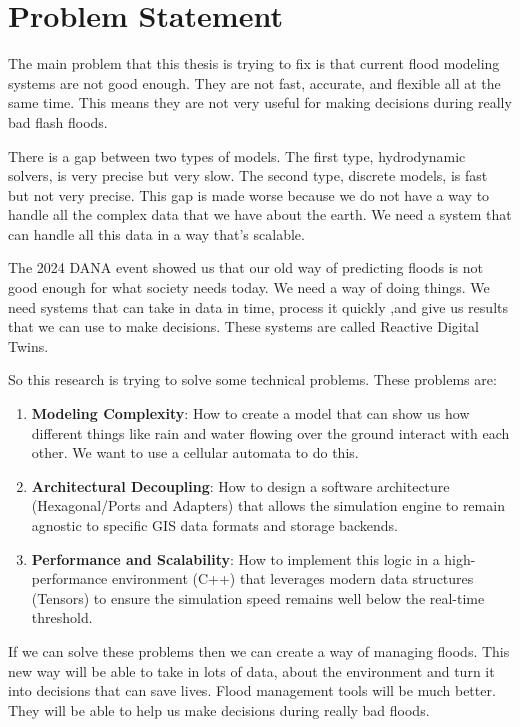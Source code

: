 \section{Problem Statement}

The main problem that this thesis is trying to fix is that current flood modeling systems are not good enough. They are not fast, 
accurate, and flexible all at the same time. This means they are not very useful for making decisions during really bad flash floods.

There is a gap between two types of models. The first type, hydrodynamic solvers, is very precise but very slow. The second type, 
discrete models, is fast but not very precise. This gap is made worse because we do not have a way to handle all the complex data 
that we have about the earth. We need a system that can handle all this data in a way that's scalable.

The 2024 DANA event showed us that our old way of predicting floods is not good enough for what society needs today. We need a way 
of doing things. We need systems that can take in data in time, process it quickly ,and give us results that we can use to make 
decisions. These systems are called Reactive Digital Twins.

So this research is trying to solve some technical problems. These problems are:

\begin{enumerate}
    \item \textbf{Modeling Complexity}: How to create a model that can show us how different things like rain and water flowing over 
    the ground interact with each other. We want to use a cellular automata to do this.
    \item \textbf{Architectural Decoupling}: How to design a software architecture (Hexagonal/Ports and Adapters) that 
    allows the simulation engine to remain agnostic to specific GIS data formats and storage backends.
    \item \textbf{Performance and Scalability}: How to implement this logic in a high-performance environment (C++) that 
    leverages modern data structures (Tensors) to ensure the simulation speed remains well below the real-time threshold.
\end{enumerate}

If we can solve these problems then we can create a way of managing floods. This new way will be able to take in lots of data, about 
the environment and turn it into decisions that can save lives. Flood management tools will be much better. They will be able to help 
us make decisions during really bad floods.
